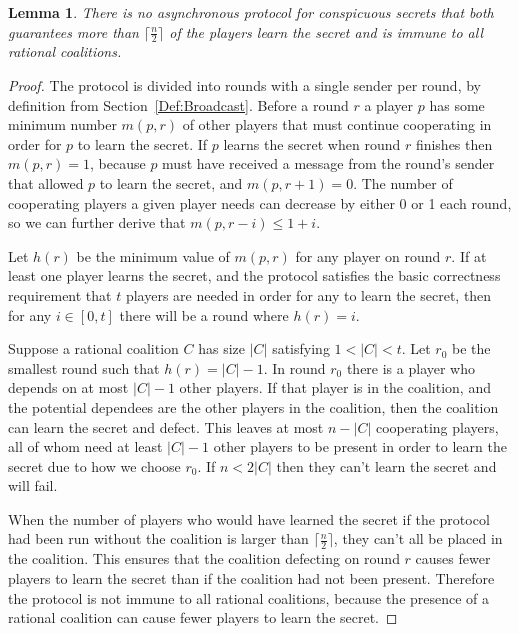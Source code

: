 \documentclass[12pt]{dalcsthesis}
\newtheorem{lemma}{Lemma}
\begin{document}
\begin{lemma}\label{Lem:Async:NoConspGoodRatImmune}There is no asynchronous protocol for conspicuous secrets that both guarantees more than $\lceil \frac{n}{2} \rceil$ of the players learn the secret and is immune to all rational coalitions.\end{lemma}
\begin{proof}
The protocol is divided into rounds with a single sender per round, by definition from Section~\ref{Def:Broadcast}. Before a round $r$ a player $p$ has some minimum number $m(p, r)$ of other players that must continue cooperating in order for $p$ to learn the secret. If $p$ learns the secret when round $r$ finishes then $m(p, r) = 1$, because $p$ must have received a message from the round's sender that allowed $p$ to learn the secret, and $m(p, r+1) = 0$. The number of cooperating players a given player needs can decrease by either 0 or 1 each round, so we can further derive that $m(p, r-i) \leq 1+i$.

Let $h(r)$ be the minimum value of $m(p, r)$ for any player on round $r$. If at least one player learns the secret, and the protocol satisfies the basic correctness requirement that $t$ players are needed in order for any to learn the secret, then for any $i \in [0, t]$ there will be a round where $h(r) = i$.

Suppose a rational coalition $C$ has size $|C|$ satisfying $1 < |C| < t$. Let $r_0$ be the smallest round such that $h(r) = |C|-1$. In round $r_0$ there is a player who depends on at most $|C|-1$ other players. If that player is in the coalition, and the potential dependees are the other players in the coalition, then the coalition can learn the secret and defect. This leaves at most $n-|C|$ cooperating players, all of whom need at least $|C|-1$ other players to be present in order to learn the secret due to how we choose $r_0$. If $n < 2 |C|$ then they can't learn the secret and will fail.

When the number of players who would have learned the secret if the protocol had been run without the coalition is larger than $\lceil \frac{n}{2} \rceil$, they can't all be placed in the coalition. This ensures that the coalition defecting on round $r$ causes fewer players to learn the secret than if the coalition had not been present. Therefore the protocol is not immune to all rational coalitions, because the presence of a rational coalition can cause fewer players to learn the secret.
\end{proof}
\end{document}
